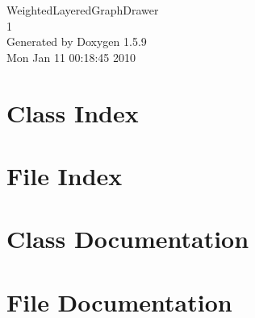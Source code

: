 \documentclass[a4paper]{book}
\begin{document}
\hypersetup{pageanchor=false}
\begin{titlepage}
\vspace*{7cm}
\begin{center}
{\Large WeightedLayeredGraphDrawer \\[1ex]\large 1 }\\
\vspace*{1cm}
{\large Generated by Doxygen 1.5.9}\\
\vspace*{0.5cm}
{\small Mon Jan 11 00:18:45 2010}\\
\end{center}
\end{titlepage}
\clearemptydoublepage
{}
\tableofcontents
\clearemptydoublepage
{}
\hypersetup{pageanchor=true}
\chapter{Class Index}

\chapter{File Index}

\chapter{Class Documentation}








\chapter{File Documentation}





















\printindex
\end{document}
